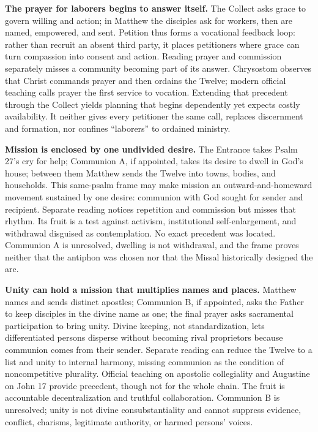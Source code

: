 \begin{deepstudy}
\noindent\textbf{The prayer for laborers begins to answer itself.\enspace{}}
The Collect asks grace to govern willing and action; in Matthew the disciples ask for workers, then are named, empowered, and sent. Petition thus forms a vocational feedback loop: rather than recruit an absent third party, it places petitioners where grace can turn compassion into consent and action. Reading prayer and commission separately misses a community becoming part of its answer. Chrysostom observes that Christ commands prayer and then ordains the Twelve; modern official teaching calls prayer the first service to vocation. Extending that precedent through the Collect yields planning that begins dependently yet expects costly availability. It neither gives every petitioner the same call, replaces discernment and formation, nor confines “laborers” to ordained ministry.

\noindent\textbf{Mission is enclosed by one undivided desire.\enspace{}}
The Entrance takes Psalm 27's cry for help; Communion A, if appointed, takes its desire to dwell in God's house; between them Matthew sends the Twelve into towns, bodies, and households. This same-psalm frame may make mission an outward-and-homeward movement sustained by one desire: communion with God sought for sender and recipient. Separate reading notices repetition and commission but misses that rhythm. Its fruit is a test against activism, institutional self-enlargement, and withdrawal disguised as contemplation. No exact precedent was located. Communion A is unresolved, dwelling is not withdrawal, and the frame proves neither that the antiphon was chosen nor that the Missal historically designed the arc.

\noindent\textbf{Unity can hold a mission that multiplies names and places.\enspace{}}
Matthew names and sends distinct apostles; Communion B, if appointed, asks the Father to keep disciples in the divine name as one; the final prayer asks sacramental participation to bring unity. Divine keeping, not standardization, lets differentiated persons disperse without becoming rival proprietors because communion comes from their sender. Separate reading can reduce the Twelve to a list and unity to internal harmony, missing communion as the condition of noncompetitive plurality. Official teaching on apostolic collegiality and Augustine on John 17 provide precedent, though not for the whole chain. The fruit is accountable decentralization and truthful collaboration. Communion B is unresolved; unity is not divine consubstantiality and cannot suppress evidence, conflict, charisms, legitimate authority, or harmed persons' voices.


\end{deepstudy}

